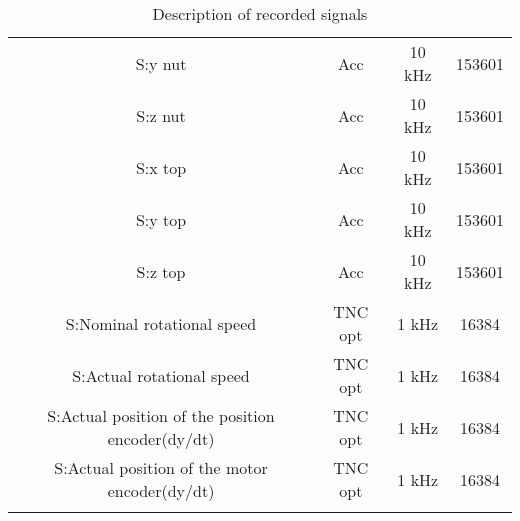 \begin{center}
\begin{longtable}{c c c c}
 S:y nut & Acc & 10 kHz & 153601 \\ 

 S:z nut & Acc & 10 kHz & 153601 \\ 

 S:x top & Acc & 10 kHz & 153601 \\ 

 S:y top & Acc & 10 kHz & 153601 \\ 
 
 S:z top & Acc & 10 kHz & 153601 \\ 
 
 S:Nominal rotational speed & TNC opt & 1 kHz & 16384 \\
 
 S:Actual rotational speed & TNC opt & 1 kHz & 16384 \\ 
 
 S:Actual position of the position encoder(dy/dt) & TNC opt & 1 kHz & 16384 \\ 
 S:Actual position of the motor encoder(dy/dt)  & TNC opt & 1 kHz & 16384  \\ [1ex] 
 \bottomrule
\caption {Description of recorded signals}
\label {tab:description_of_the_49_recorded_features}
\end{longtable}
\end{center}


